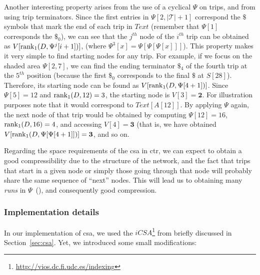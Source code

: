 	Another interesting property arises from the use of a cyclical $\Psi$ on trips, and from using trip terminators.
	Since the first entries in $\Psi[2,|\mathcal{T}|+1]$ correspond the $\$$ symbols that 
	mark the end of each trip in $Text$ (remember that $\Psi[1]$ corresponds the $\$_0$), we can see that the $j^{th}$ node of the $i^{th}$ trip can
	be obtained as $V[\operatorname{rank}_1(D, \Psi^j[i+1])]$, (where $\Psi^3[x]= \Psi[\Psi[\Psi[x]]]$). This property
	makes it very simple to find starting nodes for any trip.
	For example, if we focus on the shaded area $\Psi[2,7]$, we can find the ending terminator $\$_4$ of the
	fourth trip at the $5^{th}$ position (because the first $\$_0$
	corresponds to the final $\$$ at $S[28]$). Therefore, its starting node can be found 
	as $V[\operatorname{rank}_1(D, \Psi[4+1])]$. Since $\Psi[5] = 12$ and $\operatorname{rank}_1(D,12)= 3$, 
	the starting node is $V[3]=\mathbf{2}$. For illustration purposes note that it would correspond to $Text[A[12]]$.
	By applying $\Psi$ again, the next node of that trip would be obtained by computing $\Psi[12] = 16$, 
	$\operatorname{rank}_1(D,16)=4$, and accessing $V[4]=\mathbf{3}$  (that is, we have obtained 
	 $V[\operatorname{rank}_1(D, \Psi[\Psi[4+1]])]=\mathbf{3}$, and so on. 

	Regarding the space requirements of the \gls{csa} in \gls{ctr}, we can expect to obtain a good compressibility
	due to the structure of the network, and the fact that trips that start in a given node or simply
	those going through that node will probably share the same sequence of ``next'' nodes. This will
	lead us to obtaining many {\em runs} in $\Psi$~(\cite{NM07}), and consequently good compression.

	\subsubsection{Implementation details} In our implementation of \gls{csa}, we used the
	$iCSA$\footnote{\url{http://vios.dc.fi.udc.es/indexing}} from \cite{FBNCPR12} briefly discussed 
	in Section~\ref{sec:csa}. Yet, we introduced some small modifications:


